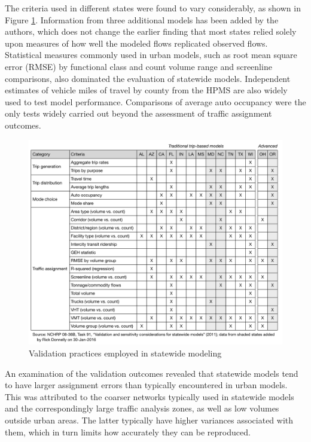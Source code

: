 The criteria used in different states were found to vary considerably, as shown in Figure \ref{fig:validation-practices}. Information from three additional models has been added by the authors, which does not change the earlier finding that most states relied solely upon measures of how well the modeled flows replicated observed flows. Statistical measures commonly used in urban models, such as root mean square error (RMSE) by functional class and count volume range and screenline comparisons, also dominated the evaluation of statewide models. Independent estimates of vehicle miles of travel by county from the HPMS are also widely used to test model performance. Comparisons of average auto occupancy were the only tests widely carried out beyond the assessment of traffic assignment outcomes.

\begin{figure}[!t]
\centering
\includegraphics[width=6.5in]{graphics/46-validation-practices}
\caption{Validation practices employed in statewide modeling}
\label{fig:validation-practices}
\end{figure}

An examination of the validation outcomes revealed that statewide models tend to have larger assignment errors than typically encountered in urban models. This was attributed to the coarser networks typically used in statewide models and the correspondingly large traffic analysis zones, as well as low volumes outside urban areas. The latter typically have higher variances associated with them, which in turn limits how accurately they can be reproduced.

